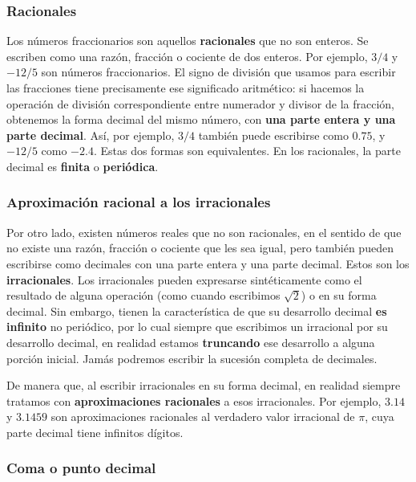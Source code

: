 \documentclass[spanish,a4paper,]{article}
\begin{document}
\hypertarget{racionales}{%
\subsubsection{Racionales}\label{racionales}}

Los números fraccionarios son aquellos \textbf{racionales} que no son
enteros. Se escriben como una razón, fracción o cociente de dos enteros.
Por ejemplo, \(3/4\) y \(-12/5\) son números fraccionarios. El signo de
división que usamos para escribir las fracciones tiene precisamente ese
significado aritmético: si hacemos la operación de división
correspondiente entre numerador y divisor de la fracción, obtenemos la
forma decimal del mismo número, con \textbf{una parte entera y una parte
decimal}. Así, por ejemplo, \(3/4\) también puede escribirse como
\(0.75\), y \(-12/5\) como \(-2.4\). Estas dos formas son equivalentes.
En los racionales, la parte decimal es \textbf{finita} o
\textbf{periódica}.

\hypertarget{aproximaciuxf3n-racional-a-los-irracionales}{%
\subsubsection{Aproximación racional a los
irracionales}\label{aproximaciuxf3n-racional-a-los-irracionales}}

Por otro lado, existen números reales que no son racionales, en el
sentido de que no existe una razón, fracción o cociente que les sea
igual, pero también pueden escribirse como decimales con una parte
entera y una parte decimal. Estos son los \textbf{irracionales}. Los
irracionales pueden expresarse sintéticamente como el resultado de
alguna operación (como cuando escribimos \(\sqrt 2\)) o en su forma
decimal. Sin embargo, tienen la característica de que su desarrollo
decimal \textbf{es infinito} no periódico, por lo cual siempre que
escribimos un irracional por su desarrollo decimal, en realidad estamos
\textbf{truncando} ese desarrollo a alguna porción inicial. Jamás
podremos escribir la sucesión completa de decimales.

De manera que, al escribir irracionales en su forma decimal, en realidad
siempre tratamos con \textbf{aproximaciones racionales} a esos
irracionales. Por ejemplo, \(3.14\) y \(3.1459\) son aproximaciones
racionales al verdadero valor irracional de \(\pi\), cuya parte decimal
tiene infinitos dígitos.

\hypertarget{coma-o-punto-decimal}{%
\subsubsection{Coma o punto decimal}\label{coma-o-punto-decimal}}
\end{document}
